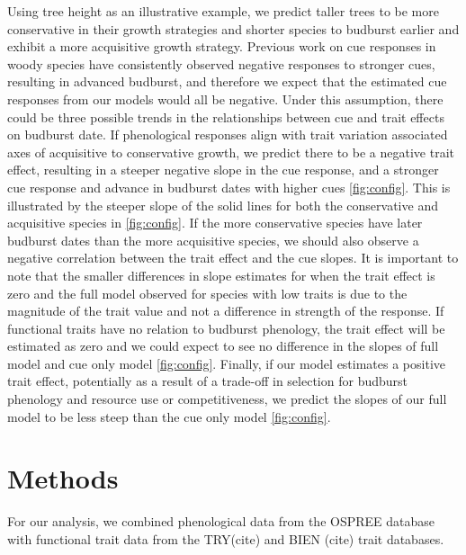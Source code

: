 \documentclass{article}\usepackage[]{graphicx}\usepackage[]{color}
\begin{document}
Using tree height as an illustrative example, we predict taller trees to be more conservative in their growth strategies and shorter species to budburst earlier and exhibit a more acquisitive growth strategy. Previous work on cue responses in woody species have consistently observed negative responses to stronger cues, resulting in advanced budburst, and therefore we expect that the estimated cue responses from our models would all be negative. Under this assumption, there could be three possible trends in the relationships between cue and trait effects on budburst date. If phenological responses align with trait variation associated axes of acquisitive to conservative growth, we predict there to be a negative trait effect, resulting in a steeper negative slope in the cue response, and a stronger cue response and advance in budburst dates with higher cues \ref{fig:config}. This is illustrated by the steeper slope of the solid lines for both the conservative and acquisitive species in \ref{fig:config}. If the more conservative species have later budburst dates than the more acquisitive species, we should also observe a negative correlation between the trait effect and the cue slopes. It is important to note that the smaller differences in slope estimates for when the trait effect is zero and the full model observed for species with low traits is due to the magnitude of the trait value and not a difference in strength of the response. If functional traits have no relation to budburst phenology, the trait effect will be estimated as zero and we could expect to see no difference in the slopes of full model and cue only model \ref{fig:config}. Finally, if our model estimates a positive trait effect, potentially as a result of a trade-off in selection for budburst phenology and resource use or competitiveness, we predict the slopes of our full model to be less steep than the cue only model \ref{fig:config}. 

\section{Methods}
For our analysis, we combined phenological data from the OSPREE database \citep{OSPREE} with functional trait data from the TRY(cite) and BIEN (cite) trait databases. 
\end{document}
